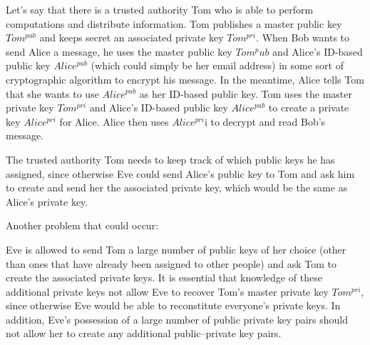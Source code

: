 \documentclass[titlepage]{article}
\begin{document}
Let's say that there is a trusted authority Tom who is able to perform computations and distribute information. Tom publishes a master public key $Tom^{pub}$ and keeps secret an associated private key $Tom^{pri}$. When Bob wants to send Alice a message, he uses the master public key $Tom^pub$ and Alice's ID-based public key $Alice^{pub}$ (which could simply be her email address) in some sort of cryptographic algorithm to encrypt his message. In the meantime, Alice tells Tom that she wants to use $Alice^{pub}$ as her ID-based public key. Tom uses the master private key $Tom^{pri}$ and Alice’s ID-based public key $Alice^{pub}$ to create a private key $Alice^{pri}$ for Alice. Alice then uses $Alice^{pri}$i to decrypt and read Bob’s message.

The trusted authority Tom needs to keep track of which public keys he has assigned, since otherwise Eve could send Alice’s public key to Tom and ask him to create and send her the associated private key, which would be the same as Alice’s private key. 

Another problem that could occur: 

Eve is allowed to send Tom a large number of public keys of her choice (other than ones that have already been assigned to other people) and ask Tom to create the associated private keys. It is essential that knowledge of these additional private keys not allow Eve to recover Tom’s master private key $Tom^{pri}$, since otherwise Eve would be able to reconstitute everyone’s private keys. In addition, Eve’s possession of a large number of public private key pairs should not allow her to create any additional public–private key pairs.
\end{document}

